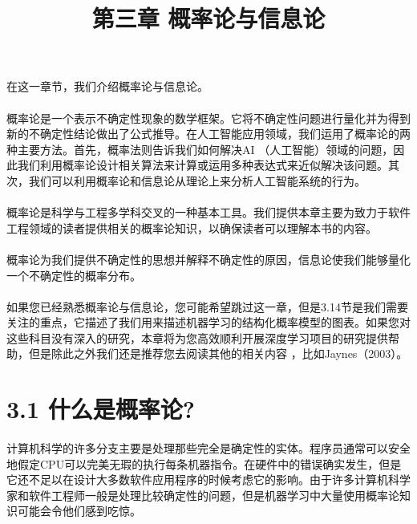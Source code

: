 \documentclass{article}
\title{第三章    概率论与信息论}
\begin{document}
  \maketitle
  \paragraph{}
  在这一章节，我们介绍概率论与信息论。
  \paragraph{}
  概率论是一个表示不确定性现象的数学框架。它将不确定性问题进行量化并为得到新的不确定性结论做出了公式推导。在人工智能应用领域，我们运用了概率论的两种主要方法。首先，概率法则告诉我们如何解决AI （人工智能）领域的问题，因此我们利用概率论设计相关算法来计算或运用多种表达式来近似解决该问题。其次，我们可以利用概率论和信息论从理论上来分析人工智能系统的行为。
 \paragraph{}
  概率论是科学与工程多学科交叉的一种基本工具。我们提供本章主要为致力于软件工程领域的读者提供相关的概率论知识，以确保读者可以理解本书的内容。
  \paragraph{}
  概率论为我们提供不确定性的思想并解释不确定性的原因，信息论使我们能够量化一个不确定性的概率分布。
  \paragraph{}
  如果您已经熟悉概率论与信息论，您可能希望跳过这一章，但是3.14节是我们需要关注的重点，它描述了我们用来描述机器学习的结构化概率模型的图表。如果您对这些科目没有深入的研究，本章将为您高效顺利开展深度学习项目的研究提供帮助，但是除此之外我们还是推荐您去阅读其他的相关内容	，比如Jaynes（2003）。


  \section*{3.1 什么是概率论?}
    \paragraph{}
    计算机科学的许多分支主要是处理那些完全是确定性的实体。程序员通常可以安全地假定CPU可以完美无瑕的执行每条机器指令。在硬件中的错误确实发生，但是它还不足以在设计大多数软件应用程序的时候考虑它的影响。由于许多计算机科学家和软件工程师一般是处理比较确定性的问题，但是机器学习中大量使用概率论知识可能会令他们感到吃惊。
\end{document}
